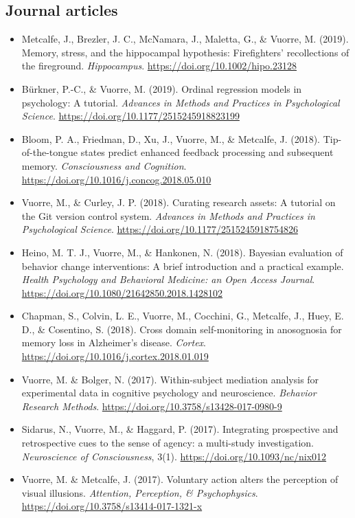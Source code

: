 \documentclass[12pt, a4paper]{article}
\newcommand{\years}[1]{\marginnote{\scriptsize #1}}
\begin{document}
\subsection*{Journal articles}
\begin{itemize}
\item \years{2019} Metcalfe, J., Brezler, J. C., McNamara, J., Maletta, G., \& Vuorre, M. (2019). Memory, stress, and the hippocampal hypothesis: Firefighters' recollections of the fireground. \emph{Hippocampus}. \url{https://doi.org/10.1002/hipo.23128}
\item Bürkner, P.-C., \& Vuorre, M. (2019). Ordinal regression models in psychology: A tutorial. \emph{Advances in Methods and Practices in Psychological Science}. \url{https://doi.org/10.1177/2515245918823199}
\item \years{2018} Bloom, P. A., Friedman, D., Xu, J., Vuorre, M., \& Metcalfe, J. (2018). Tip-of-the-tongue states predict enhanced feedback processing and subsequent memory. \emph{Consciousness and Cognition}. \url{https://doi.org/10.1016/j.concog.2018.05.010}
\item Vuorre, M., \& Curley, J. P. (2018). Curating research assets: A tutorial on the Git version control system. \emph{Advances in Methods and Practices in Psychological Science}. \url{https://doi.org/10.1177/2515245918754826}
\item Heino, M. T. J.\footnotemark[1], Vuorre, M.\footnotemark[1], \& Hankonen, N. (2018). Bayesian evaluation of behavior change interventions: A brief introduction and a practical example. \emph{Health Psychology and Behavioral Medicine: an Open Access Journal}. \url{https://doi.org/10.1080/21642850.2018.1428102}
\item Chapman, S., Colvin, L. E., Vuorre, M., Cocchini, G., Metcalfe, J., Huey, E. D., \& Cosentino, S. (2018). Cross domain self-monitoring in anosognosia for memory loss in Alzheimer's disease. \emph{Cortex}. \url{https://doi.org/10.1016/j.cortex.2018.01.019}
\item \years{2017} Vuorre, M. \& Bolger, N. (2017). Within-subject mediation analysis for experimental data in cognitive psychology and neuroscience. \emph{Behavior Research Methods}. \url{https://doi.org/10.3758/s13428-017-0980-9}
\item Sidarus, N., Vuorre, M., \& Haggard, P. (2017). Integrating prospective and retrospective cues to the sense of agency: a multi-study investigation. \emph{Neuroscience of Consciousness}, 3(1). \url{https://doi.org/10.1093/nc/nix012}
\item Vuorre, M. \& Metcalfe, J. (2017). Voluntary action alters the perception of visual illusions. \emph{Attention, Perception, \& Psychophysics}. \url{https://doi.org/10.3758/s13414-017-1321-x}

\end{itemize}
\end{document}

